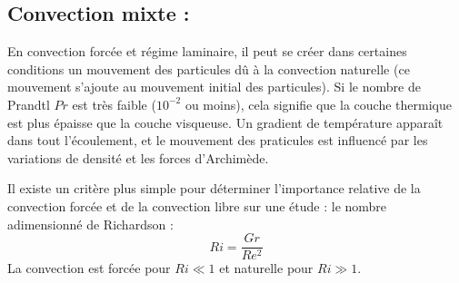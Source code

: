 \subsection{Convection mixte :}

En convection forcée et régime laminaire, il peut se créer dans certaines conditions un mouvement des particules dû à la convection naturelle (ce mouvement s'ajoute au mouvement initial des particules). Si le nombre de Prandtl $Pr$ est très faible ($10^{-2}$ ou moins), cela signifie que la couche thermique est plus épaisse que la couche visqueuse. Un gradient de température apparaît dans tout l'écoulement, et le mouvement des praticules est influencé par les variations de densité et les forces d'Archimède.

Il existe un critère plus simple pour déterminer l'importance relative de la convection forcée et de la convection libre sur une étude : le nombre adimensionné de Richardson :
%
\begin{equation}
Ri = \frac{Gr}{Re^2}
\end{equation}
%
La convection est forcée pour $Ri \ll 1$ et naturelle pour $Ri \gg 1$.
